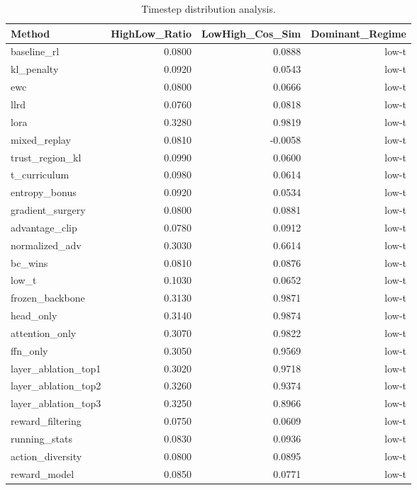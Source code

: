 \begin{table}[htbp]
\centering
\caption{Timestep distribution analysis.}
\label{tab:t_dist}
\begin{tabular}{lrrr}
\toprule
\textbf{Method} & \textbf{HighLow\_Ratio} & \textbf{LowHigh\_Cos\_Sim} & \textbf{Dominant\_Regime} \\
\midrule
baseline\_rl & 0.0800 & 0.0888 & low-t \\
kl\_penalty & 0.0920 & 0.0543 & low-t \\
ewc & 0.0800 & 0.0666 & low-t \\
llrd & 0.0760 & 0.0818 & low-t \\
lora & 0.3280 & 0.9819 & low-t \\
mixed\_replay & 0.0810 & -0.0058 & low-t \\
trust\_region\_kl & 0.0990 & 0.0600 & low-t \\
t\_curriculum & 0.0980 & 0.0614 & low-t \\
entropy\_bonus & 0.0920 & 0.0534 & low-t \\
gradient\_surgery & 0.0800 & 0.0881 & low-t \\
advantage\_clip & 0.0780 & 0.0912 & low-t \\
normalized\_adv & 0.3030 & 0.6614 & low-t \\
bc\_wins & 0.0810 & 0.0876 & low-t \\
low\_t & 0.1030 & 0.0652 & low-t \\
frozen\_backbone & 0.3130 & 0.9871 & low-t \\
head\_only & 0.3140 & 0.9874 & low-t \\
attention\_only & 0.3070 & 0.9822 & low-t \\
ffn\_only & 0.3050 & 0.9569 & low-t \\
layer\_ablation\_top1 & 0.3020 & 0.9718 & low-t \\
layer\_ablation\_top2 & 0.3260 & 0.9374 & low-t \\
layer\_ablation\_top3 & 0.3250 & 0.8966 & low-t \\
reward\_filtering & 0.0750 & 0.0609 & low-t \\
running\_stats & 0.0830 & 0.0936 & low-t \\
action\_diversity & 0.0800 & 0.0895 & low-t \\
reward\_model & 0.0850 & 0.0771 & low-t \\
\bottomrule
\end{tabular}
\end{table}